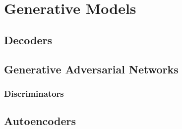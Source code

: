 \setchapterpreamble[u]{\margintoc}
\chapter{Generative Models}

\section{Decoders}

\section{Generative Adversarial Networks}

\subsection{Discriminators}

\section{Autoencoders}

